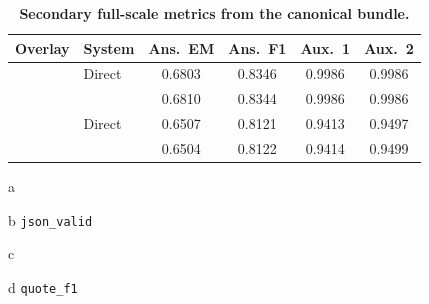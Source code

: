 \begin{table}[h]
    \centering
    \begin{threeparttable}
    \caption{\textbf{Secondary full-scale metrics from the canonical bundle.}}
    \label{tab:additional-metrics}
    \small
    \setlength{\tabcolsep}{4pt}
    \renewcommand{\arraystretch}{1.06}
    \begin{tabular}{l l
                    S[table-format=1.4]
                    S[table-format=1.4]
                    S[table-format=1.4]
                    S[table-format=1.4]}
        \toprule
        \textbf{Overlay} & \textbf{System} &
        {\textbf{Ans.\ EM}} &
        {\textbf{Ans.\ F1}} &
        {\textbf{Aux.\ 1}} &
        {\textbf{Aux.\ 2}} \\
        \midrule
         & Direct & 0.6803 & 0.8346 & 0.9986  & 0.9986  \\
                                     & \method{} & 0.6810 & 0.8344 & 0.9986  & 0.9986  \\
         & Direct & 0.6507 & 0.8121 & 0.9413  & 0.9497  \\
                                     & \method{} & 0.6504 & 0.8122 & 0.9414  & 0.9499  \\
        \bottomrule
    \end{tabular}
    \begin{tablenotes}[flushleft]
        \footnotesize
        \item[a] \jsonmetric
        \item[b] \texttt{json\_valid}
        \item[c] \quotemetric
        \item[d] \texttt{quote\_f1}
    \end{tablenotes}
    \end{threeparttable}
\end{table}
